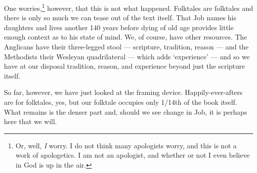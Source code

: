 One worries,\footnote{Or, well, \emph{I} worry. I do not think many apologists worry, and this is not a work of apologetics. I am not an apologist, and whether or not I even believe in God is up in the air.} however, that this is not what happened. Folktales are folktales and there is only so much we can tease out of the text itself. That Job names his daughters and lives another 140 years before dying of old age provides little enough context as to his state of mind. We, of course, have other resources. The Anglicans have their three-legged stool --- scripture, tradition, reason --- and the Methodists their Wesleyan quadrilateral --- which adds `experience' --- and so we have at our disposal tradition, reason, and experience beyond just the scripture itself.

So far, however, we have just looked at the framing device. Happily-ever-afters are for folktales, yes, but our folktale occupies only 1/14th of the book itself. What remains is the denser part and, should we see change in Job, it is perhaps here that we will.
